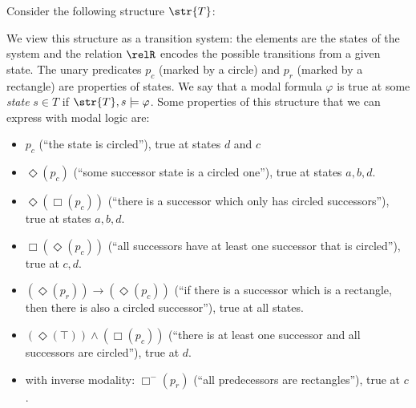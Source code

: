 \begin{example}
  Consider the following structure $\str{T}$:
  \begin{center}
  
  \end{center}
  We view this structure as a transition system: the elements are the states of the system and the relation $\relR$ encodes the possible transitions from a given state.
  The unary predicates $p_{c}$ (marked by a circle) and $p_{r}$ (marked by a rectangle) are properties of states.
  We say that a modal formula $\varphi$ is true at some \emph{state} $s \in T$ if $\str{T}, s \models \varphi$.
  Some properties of this structure that we can express with modal logic are:
  \begin{itemize}
    \item $p_{c}$ (``the state is circled''), true at states $d$ and $c$
    \item $\Diamond(p_{c})$ (``some successor state is a circled one''), true at states $a, b, d$.
    \item $\Diamond(\Box(p_{c}))$ (``there is a successor which only has circled successors''), true at states $a, b, d$.
    \item $\Box(\Diamond(p_{c}))$ (``all successors have at least one successor that is circled''), true at $c,d$.
    \item $(\Diamond(p_{r})) \to (\Diamond(p_{c}))$ (``if there is a successor which is a rectangle, then there is also a circled successor''), true at all states.
    \item $(\Diamond(\top)) \land (\Box(p_{c}))$ (``there is at least one successor and all successors are circled''), true at $d$.
    \item with inverse modality: $\Box^{-}(p_{r})$ (``all predecessors are rectangles''), true at $c$.
  \end{itemize}
\end{example}

